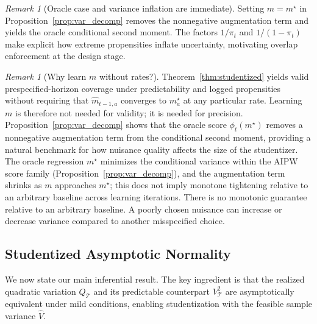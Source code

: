 \documentclass[11pt]{article}
\numberwithin{equation}{section}
\theoremstyle{plain}
\theoremstyle{definition}
\theoremstyle{remark}
\newtheorem{remark}[theorem]{Remark}
\begin{document}
\begin{remark}[Oracle case and variance inflation are immediate]\label{rem:oracle_from_decomp}
Setting $m=m^\star$ in Proposition~\ref{prop:var_decomp} removes the
nonnegative augmentation term and yields the oracle conditional second moment.
The factors $1/\pi_t$ and $1/(1-\pi_t)$ make explicit how extreme propensities
inflate uncertainty, motivating overlap enforcement at the design stage.
\end{remark}

\begin{remark}[Why learn $m$ without rates?]\label{rem:why_learn_m}
Theorem~\ref{thm:studentized} yields valid prespecified-horizon coverage under predictability and logged propensities without requiring that $\widehat m_{t-1,a}$ converges to $m_a^\star$ at any particular rate. Learning $m$ is therefore not needed for validity; it is needed for precision. Proposition~\ref{prop:var_decomp} shows that the oracle score $\phi_t(m^\star)$ removes a nonnegative augmentation term from the conditional second moment, providing a natural benchmark for how nuisance quality affects the size of the studentizer. The oracle regression $m^\star$ minimizes the conditional variance within the AIPW score family (Proposition~\ref{prop:var_decomp}), and the augmentation term shrinks as $m$ approaches $m^\star$; this does not imply monotone tightening relative to an arbitrary baseline across learning iterations. There is no monotonic guarantee relative to an arbitrary baseline. A poorly chosen nuisance can increase or decrease variance compared to another misspecified choice.
\end{remark}

\subsection{Studentized Asymptotic Normality}\label{sec:studentized_clt}

We now state our main inferential result. The key ingredient is that the
realized quadratic variation $Q_{\mathcal{T}}$ and its predictable counterpart
$V_{\mathcal{T}}^2$ are asymptotically equivalent under mild conditions,
enabling studentization with the feasible sample variance $\widehat V$.
\end{document}
